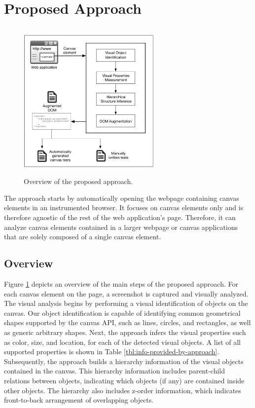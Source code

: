 
\section{Proposed Approach}\label{sec:approach}

\begin{figure}[t]
    \centering
    \includegraphics[trim={0.0cm 0.0cm 0.0cm 0.0cm},clip,height=7.9cm,width=0.62\textwidth]{testability/figures/canvasure-overview-figure.pdf}
    \caption{Overview of the proposed approach.}
    \label{fig:approach-overview-1}
\end{figure}

The approach starts by automatically opening the webpage containing canvas elements in an instrumented browser.
It focuses on canvas elements only and is therefore agnostic of the rest of the web application's page.
Therefore, it can analyze canvas elements contained in a larger webpage or canvas applications that are solely composed of a single canvas element.

\subsection{Overview}
Figure \ref{fig:approach-overview-1} depicts an overview of the main steps of the proposed approach.
For each canvas element on the page, a screenshot is captured and visually analyzed.
The visual analysis begins by performing a visual identification of objects on the canvas.
Our object identification is capable of identifying common geometrical shapes supported by the canvas API, such as lines, circles, and rectangles, as well as generic arbitrary shapes.
Next, the approach infers the visual properties such as color, size, and location, for each of the detected visual objects.
A list of all supported properties is shown in Table \ref{tbl:info-provided-by-approach}.
Subsequently, the approach builds a hierarchy information of the visual objects contained in the canvas.
This hierarchy information includes parent-child relations between objects, indicating which objects (if any) are contained inside other objects.
The hierarchy also includes z-order information, which indicates front-to-back arrangement of overlapping objects.

